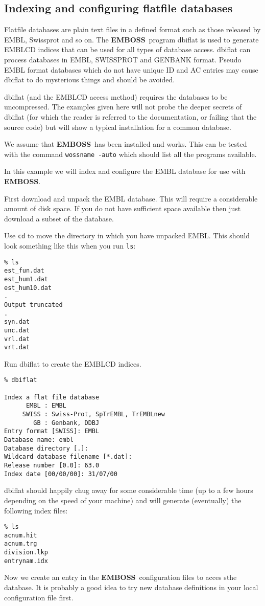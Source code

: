 \documentclass{report}
\newcommand{\ilcomm}[1]{{\tt #1}}
\newcommand{\progname}[1]{{\sc #1}}
\newcommand{\EMBOSS}{{\sf\bfseries EMBOSS}}
\begin{document}
	\subsection{Indexing and configuring flatfile databases}

Flatfile databases are plain text files in a defined format such as those released by EMBL, Swissprot and so on. The \EMBOSS\ program \progname{dbiflat} is used to generate EMBLCD indices that can be used for all types of database access. \progname{dbiflat} can process databases in EMBL, SWISSPROT and GENBANK format. Pseudo EMBL format databases which do not have unique ID and AC entries may cause \progname{dbiflat} to do mysterious things and should be avoided.

\progname{dbiflat} (and the EMBLCD access method) requires the databases to be uncompressed. The examples given here will not probe the deeper secrets of \progname{dbiflat} (for which the reader is referred to the documentation, or failing that the source code) but will show a typical installation for a common database.

We assume that \EMBOSS\ has been installed and works. This can be tested with the command \ilcomm{wossname -auto} which should list all the programs available.

In this example we will index and configure the EMBL database for use with \EMBOSS.

First download and unpack the EMBL database. This will require a considerable amount of disk space. If you do not have sufficient space available then just download a subset of the database.

Use \ilcomm{cd} to move the directory in which you have unpacked EMBL. This should look something like this when you run \ilcomm{ls}:
\begin{verbatim}
% ls
est_fun.dat
est_hum1.dat
est_hum10.dat
.
Output truncated
.
syn.dat
unc.dat
vrl.dat
vrt.dat
\end{verbatim}
Run \progname{dbiflat} to create the EMBLCD indices.
\begin{verbatim}
% dbiflat

Index a flat file database
      EMBL : EMBL
     SWISS : Swiss-Prot, SpTrEMBL, TrEMBLnew
        GB : Genbank, DDBJ
Entry format [SWISS]: EMBL   
Database name: embl
Database directory [.]: 
Wildcard database filename [*.dat]: 
Release number [0.0]: 63.0
Index date [00/00/00]: 31/07/00
\end{verbatim}
\progname{dbiflat} should happily chug away for some considerable time (up to a few hours depending on the speed of your machine) and will generate (eventually) the following index files:
\begin{verbatim}
% ls
acnum.hit
acnum.trg
division.lkp
entrynam.idx
\end{verbatim}
Now we create an entry in the \EMBOSS\ configuration files to acces sthe database. It is probably a good idea to try new database definitions in your local configuration file first.
\end{document}
